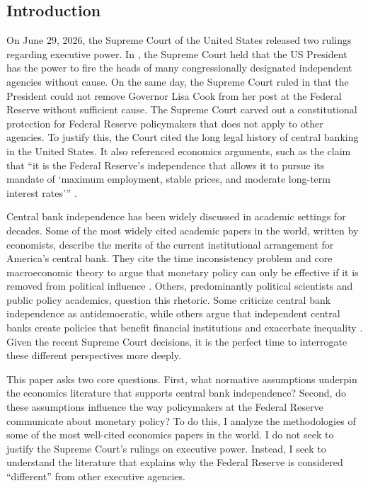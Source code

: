 \documentclass[12pt,a4paper]{article}
\begin{document}
\begin{doublespace}
\newpage
\section{Introduction} 
\label{sec:intro}


On June 29, 2026, the Supreme Court of the United States released two rulings regarding executive power. In \textcite[syllabus, at 6]{trump_slaughter_2026}, the Supreme Court held that the US President has the power to fire the heads of many congressionally designated independent agencies without cause. On the same day, the Supreme Court ruled in \textcite{trump_cook_2026} that the President could not remove Governor Lisa Cook from her post at the Federal Reserve without sufficient cause. The Supreme Court carved out a constitutional protection for Federal Reserve policymakers that does not apply to other agencies. To justify this, the Court cited the long legal history of central banking in the United States. It also referenced economics arguments, such as the claim that ``it is the Federal Reserve’s independence that allows it to pursue its mandate of `maximum employment, stable prices, and moderate long-term interest rates'{}'' \parencite[slip op. at 14]{trump_cook_2026}.



Central bank independence has been widely discussed in academic settings for decades. Some of the most widely cited academic papers in the world, written by economists, describe the merits of the current institutional arrangement for America's central bank. They cite the time inconsistency problem and core macroeconomic theory to argue that monetary policy can only be effective if it is removed from political influence \parencite{kydland_rules_1977, barro_rules_1983, rogoff_optimal_1985}. Others, predominantly political scientists and public policy academics, question this rhetoric. Some criticize central bank independence as antidemocratic, while others argue that independent central banks create policies that benefit financial institutions and exacerbate inequality \parencite{woodruff_democratize_2019, jacobs_fed_2021, stiglitz_price_2013}. Given the recent Supreme Court decisions, it is the perfect time to interrogate these different perspectives more deeply.


This paper asks two core questions. First, what normative assumptions underpin the economics literature that supports central bank independence? Second, do these assumptions influence the way policymakers at the Federal Reserve communicate about monetary policy? To do this, I analyze the methodologies of some of the most well-cited economics papers in the world. I do not seek to justify the Supreme Court's rulings on executive power. Instead, I seek to understand the literature that explains why the Federal Reserve is considered ``different'' from other executive agencies.


\end{doublespace}
\end{document}
